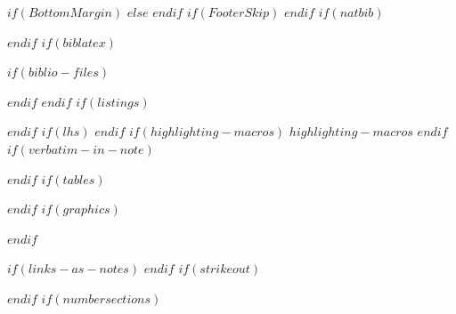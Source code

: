 \setlength{\defaultbottommargin}{1in}
$if(BottomMargin)$
\setlength{\defaultbottommargin}{$BottomMargin$}
$else$
\setlength{\defaultbottommargin}{1in}
$endif$
\setlength{\defaultheadheight}{\headheight}
$if(FooterSkip)$
\geometry{footskip=$FooterSkip$}
$endif$
$if(natbib)$
\usepackage{natbib}

$endif$
$if(biblatex)$
\usepackage{biblatex}
$if(biblio-files)$

$endif$
$endif$
$if(listings)$
\usepackage{listings}
$endif$
$if(lhs)$
$endif$
$if(highlighting-macros)$
$highlighting-macros$
$endif$
$if(verbatim-in-note)$
\usepackage{fancyvrb}
$endif$
$if(tables)$
\usepackage{longtable,booktabs}
$endif$
$if(graphics)$
\usepackage{graphicx}
\makeatletter
\makeatother
$endif$
\ifxetex
  \usepackage[setpagesize=false, unicode=false, xetex]{hyperref}
\else
  \usepackage{hyperref}
\fi
{}
$if(links-as-notes)$
\renewcommand{\href}[2]{#2\footnote{\url{#1}}}
$endif$
$if(strikeout)$
\usepackage[normalem]{ulem}
\pdfstringdefDisableCommands{\renewcommand{\sout}{}}
$endif$
\setlength{\parindent}{0pt}
\setlength{\parskip}{6pt plus 2pt minus 1pt}
\setlength{\emergencystretch}{3em}  %
\providecommand{\tightlist}{%
\setlength{\itemsep}{0pt}\setlength{\parskip}{0pt}}
$if(numbersections)$
\setcounter{secnumdepth}{5}
